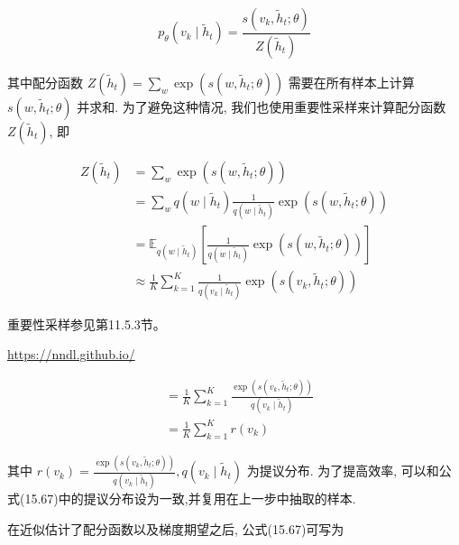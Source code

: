 \documentclass[10pt]{article}
\begin{document}
\begin{equation*}
p_{\theta}\left(v_{k} \mid \tilde{h}_{t}\right)=\frac{s\left(v_{k}, \tilde{h}_{t} ; \theta\right)}{Z\left(\tilde{h}_{t}\right)} \tag{15.68}
\end{equation*}


其中配分函数 $Z\left(\tilde{h}_{t}\right)=\sum_{w} \exp \left(s\left(w, \tilde{h}_{t} ; \theta\right)\right)$ 需要在所有样本上计算 $s\left(w, \tilde{h}_{t} ; \theta\right)$ 并求和. 为了避免这种情况, 我们也使用重要性采样来计算配分函数 $Z\left(\tilde{h}_{t}\right)$, 即


\begin{align*}
Z\left(\tilde{h}_{t}\right) & =\sum_{w} \exp \left(s\left(w, \tilde{h}_{t} ; \theta\right)\right)  \tag{15.69}\\
& =\sum_{w} q\left(w \mid \tilde{h}_{t}\right) \frac{1}{q\left(w \mid \tilde{h}_{t}\right)} \exp \left(s\left(w, \tilde{h}_{t} ; \theta\right)\right)  \tag{15.70}\\
& =\mathbb{E}_{q\left(w \mid \tilde{h}_{t}\right)}\left[\frac{1}{q\left(w \mid \tilde{h}_{t}\right)} \exp \left(s\left(w, \tilde{h}_{t} ; \theta\right)\right)\right]  \tag{15.71}\\
& \approx \frac{1}{K} \sum_{k=1}^{K} \frac{1}{q\left(v_{k} \mid \tilde{h}_{t}\right)} \exp \left(s\left(v_{k}, \tilde{h}_{t} ; \theta\right)\right) \tag{15.72}
\end{align*}


重要性采样参见第11.5.3节。

\href{https://nndl.github.io/}{https://nndl.github.io/}


\begin{align*}
& =\frac{1}{K} \sum_{k=1}^{K} \frac{\exp \left(s\left(v_{k}, \tilde{h}_{t} ; \theta\right)\right)}{q\left(v_{k} \mid \tilde{h}_{t}\right)}  \tag{15.73}\\
& =\frac{1}{K} \sum_{k=1}^{K} r\left(v_{k}\right) \tag{15.74}
\end{align*}


其中 $r\left(v_{k}\right)=\frac{\exp \left(s\left(v_{k}, \tilde{h}_{t} ; \theta\right)\right)}{q\left(v_{k} \mid \tilde{h}_{t}\right)}, q\left(v_{k} \mid \tilde{h}_{t}\right)$ 为提议分布. 为了提高效率, 可以和公式(15.67)中的提议分布设为一致,并复用在上一步中抽取的样本.

在近似估计了配分函数以及梯度期望之后, 公式(15.67)可写为
\end{document}
